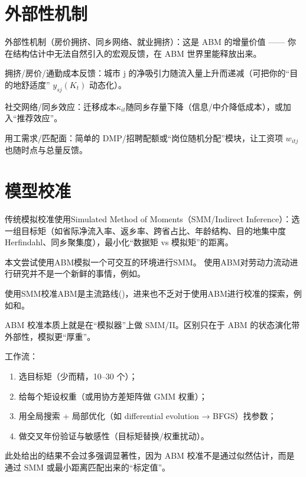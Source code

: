 \documentclass[
  a4paper,
  zihao=-4,
  fontset=mac,
  AutoFakeBold,
  AutoFakeSlant,
  oneside]{ctexbook}
\begin{document}
\section{外部性机制} %
\label{sec:外部性机制}

外部性机制（房价拥挤、同乡网络、就业拥挤）：这是 ABM 的增量价值 —— 你在结构估计中无法自然引入的宏观反馈，在 ABM 世界里能释放出来。

拥挤/房价/通勤成本反馈：城市 j 的净吸引力随流入量上升而递减（可把你的“目的地舒适度” $y_{sj}(K_t)$ 动态化）。

社交网络/同乡效应：迁移成本$\kappa_{it}$随同乡存量下降（信息/中介降低成本），或加入“推荐效应”。

用工需求/匹配面：简单的 DMP/招聘配额或“岗位随机分配”模块，让工资项 $w_{itj}$ 也随时点与总量反馈。



\section{模型校准} %
\label{sub:模型校准}


传统模拟校准使用Simulated Method of Moments（SMM/Indirect Inference）：选一组目标矩（如省际净流入率、返乡率、跨省占比、年龄结构、目的地集中度 Herfindahl、同乡聚集度），最小化“数据矩 vs 模拟矩”的距离。

本文尝试使用ABM模拟一个可交互的环境进行SMM。
使用ABM对劳动力流动进行研究并不是一个新鲜的事情，例如\textcite{fuAgentBasedModelingChinas2018,klabundeDecisionmakingAgentbasedModels2016}。

使用SMM校准ABM是主流路线(\textcite{plattComparisonEconomicAgentbased2020})，进来也不乏对于使用ABM进行校准的探索，例如\textcite{rahmandadUsingMethodSimulated2015}和\textcite{pietzschMetamodelsEvaluatingCalibrating2020}。

ABM 校准本质上就是在“模拟器”上做 SMM/II。区别只在于 ABM 的状态演化带外部性，模拟更“厚重”。

工作流：
\begin{enumerate}
\item 选目标矩（少而精，10–30 个）；
\item 给每个矩设权重（或用协方差矩阵做 GMM 权重）；
\item 用全局搜索 + 局部优化（如 differential evolution → BFGS）找参数；
\item 做交叉年份验证与敏感性（目标矩替换/权重扰动）。
\end{enumerate}


此处给出的结果不会过多强调显著性，因为 ABM 校准不是通过似然估计，而是通过 SMM 或最小距离匹配出来的“标定值”。
\end{document}
